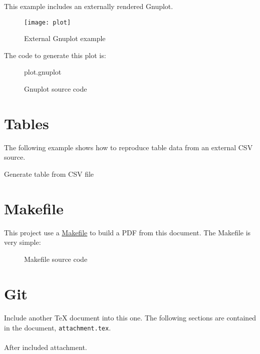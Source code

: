 \documentclass[10pt,a4paper]{article}
\begin{document}
This example includes an externally rendered Gnuplot.

\begin{figure}[h]
  \centering
  \texttt{[image: plot]}
  \caption{External Gnuplot example}
\end{figure}

The code to generate this plot is:
\begin{figure}[h]
  \begin{lstinputlisting}[language=Gnuplot]{plot.gnuplot}
  \end{lstinputlisting}
  \caption{Gnuplot source code}
\end{figure}

\sectionbreak{}

\section*{Tables}

The following example shows how to reproduce table data from an external CSV source.

\begin{table}[h]
\label{table1}
  \begin{center}
    \caption{Generate table from CSV file}
  \end{center}
\end{table}

\lipsum[3]

\sectionbreak{}

\section*{Makefile}

This project use a \href{https://www.gnu.org/software/make/}{Makefile} to build
a PDF from this document. The Makefile is very simple:

\begin{figure}[h]
  
  \caption{Makefile source code}
\end{figure}

\sectionbreak{}

\section*{Git}

\paragraph{}
Include another TeX document into this one. The following sections are
contained in the document, \texttt{attachment.tex}.



\paragraph{}
After included attachment.
\end{document}
